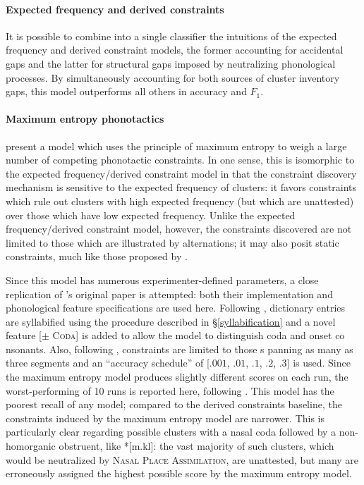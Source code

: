 \paragraph{Expected frequency and derived constraints}
It is possible to combine into a single classifier the intuitions of the expected frequency and derived constraint models, the former accounting for accidental gaps and the latter for structural gaps imposed by neutralizing phonological processes.
By simultaneously accounting for both sources of cluster inventory gaps, this model outperforms all others in accuracy and $F_1$. 

\paragraph{Maximum entropy phonotactics} 
\citet{Hayes2008a} present a model which uses the principle of maximum entropy to weigh a large number of competing phonotactic constraints. 
In one sense, this is isomorphic to the expected frequency/derived constraint model in that the constraint discovery mechanism is sensitive to the expected frequency of clusters: it favors constraints which rule out clusters with high expected frequency (but which are unattested) over those which have low expected frequency.
Unlike the expected frequency/derived constraint model, however, the constraints discovered are not limited to those which are illustrated by alternations; it may also posit static constraints, much like those proposed by \citet{Pierrehumbert1994}.

Since this model has numerous experimenter-defined parameters, a close replication of \citeauthor{Hayes2008a}'s original paper is attempted: both their implementation and phonological feature specifications are used here.
Following \citet{HayesInPress}, dictionary entries are syllabified using the procedure described in \S\ref{syllabification} and a novel feature [$\pm$
\textsc{Coda}] is added to allow the model to distinguish coda and onset co
nsonants.
Also, following \citeauthor{Hayes2008a}, constraints are limited to those s
panning as many as three segments and an ``accuracy schedule'' of [$.001$, 
$.01$, $.1$, $.2$, $.3$] is used.
Since the maximum entropy model produces slightly different scores on each 
run, the worst-performing of 10 runs is reported here, following \citeauthor{Hayes2008a}.
This model has the poorest recall of any model; compared to the derived constraints baseline, the constraints induced by the maximum entropy model are narrower.
This is particularly clear regarding possible clusters with a nasal coda followed by a non-homorganic obstruent, like *[m.kl]: the vast majority of such clusters, which would be neutralized by \textsc{Nasal Place Assimilation}, are unattested, but many are erroneously assigned the highest possible score by the maximum entropy model.

